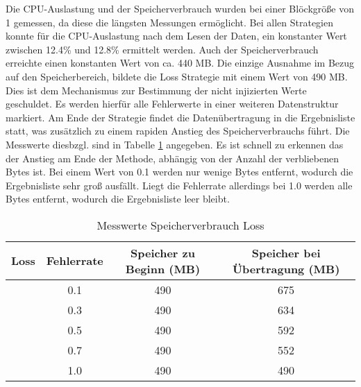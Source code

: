 Die CPU-Auslastung und der Speicherverbrauch wurden bei einer Bl\"ockgr\"o\ss e von 1 gemessen, da diese die l\"angsten Messungen erm\"oglicht. Bei allen Strategien konnte f\"ur die CPU-Auslastung nach dem Lesen der Daten, ein konstanter Wert zwischen 12.4\% und 12.8\% ermittelt werden. Auch der Speicherverbrauch erreichte einen  konstanten Wert von ca. 440 MB. Die einzige Ausnahme im Bezug auf den Speicherbereich, bildete die Loss Strategie mit einem Wert von 490 MB. Dies ist dem Mechanismus zur Bestimmung der nicht injizierten Werte geschuldet. Es werden hierf\"ur alle Fehlerwerte in einer weiteren Datenstruktur markiert. Am Ende der Strategie findet die Daten\"ubertragung in die Ergebnisliste statt, was zusätzlich zu einem rapiden Anstieg des Speicherverbrauchs f\"uhrt. Die Messwerte diesbzgl. sind in Tabelle \ref{tblSpeicherLoss} angegeben. Es ist schnell zu erkennen das der Anstieg am Ende der Methode, abh\"angig von der Anzahl der verbliebenen Bytes ist. Bei einem Wert von 0.1 werden nur wenige Bytes entfernt, wodurch die Ergebnisliste sehr gro\ss{} ausf\"allt. Liegt die Fehlerrate allerdings bei 1.0 werden alle Bytes entfernt, wodurch die Ergebnisliste leer bleibt.

\begin{table}[!htbp]
\centering
\begin{tabular}{c|c|c|c|}
Loss & Fehlerrate & Speicher zu Beginn (MB) & Speicher bei \"Ubertragung (MB)\\
\hline
& 0.1 & 490 & 675\\
& 0.3 & 490 & 634\\
& 0.5 & 490 & 592\\
& 0.7 & 490 & 552\\
& 1.0 & 490 & 490\\
\end{tabular}
\caption{Messwerte Speicherverbrauch Loss}
\label{tblSpeicherLoss}
\end{table}



